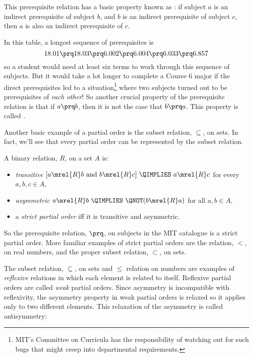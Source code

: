 This prerequisite relation has a basic property known as
: if subject $a$ is an indirect prerequisite of
subject $b$, and $b$ is an indirect prerequisite of subject $c$, then
$a$ is also an indirect prerequisite of $c$.

In this table, a longest sequence of prerequisites is
\[
18.01 \prq 18.03 \prq 6.002 \prq 6.004 \prq 6.033 \prq 6.857
\]
so a student would need at least six terms to work through this sequence
of subjects.  But it would take a lot longer to complete a Course 6 major
if the direct prerequisites led to a situation\footnote{MIT's Committee on
Curricula has the responsibility of watching out for such bugs that might
creep into departmental requirements.} where two subjects turned out to be
prerequisites of \emph{each other}!  So another crucial property of the
prerequisite relation is that if $a \prq b$, then it is not the case that
$b \prq a$.  This property is called .

Another basic example of a partial order is the subset relation,
$\subseteq$, on sets.  In fact, we'll see that every partial order can be
represented by the subset relation.

\begin{definition}
A binary relation, $R$, on a set $A$ is:
\begin{itemize}

\item \emph{transitive} \qiff 
$[a \mrel{R}  b \text{ and } b \mrel{R}  c]\ \QIMPLIES\  a \mrel{R}  c$
\quad for every $a,b,c\in A$,

\item \emph{asymmetric} \qiff
$a \mrel{R}  b\  \QIMPLIES\  \QNOT(b \mrel{R}  a)$
\quad for all $a,b\in A$,

\item a \emph{strict partial order} iff it is transitive and asymmetric.
\end{itemize}

\end{definition}

So the prerequisite relation, $\prq$, on subjects in the MIT catalogue is
a strict partial order.  More familiar examples of strict partial orders
are the relation, $<$, on real numbers, and the proper subset relation,
$\subset$, on sets.

The subset relation, $\subseteq$, on sets and $\leq$ relation on numbers
are examples of \emph{reflexive} relations in which each element is
related to itself.  Reflexive partial orders are called \emph{weak}
partial orders.  Since asymmetry is incompatible with reflexivity, the
asymmetry property in weak partial orders is relaxed so it applies only to
two different elements.  This relaxation of the asymmetry is called
antisymmetry:

